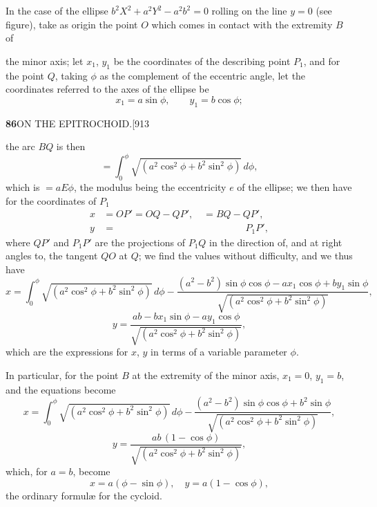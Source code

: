\documentclass[11pt]{article}
\begin{document}
\hspace{1em} In the case of the ellipse $b^{2}X^{2}+a^{2}Y^{2}-a^{2}b^{2}=0$
rolling on the line $y=0$ (see figure), take as origin the point $O$ which
comes in contact with the extremity $B$ of

\begin{center}
\end{center}

\noindent the minor axis; let $x_{1}$, $y_{1}$ be the coordinates of the
describing point $P_{1}$, and for the point $Q$, taking $\phi$ as the
complement of the eccentric angle, let the coordinates referred to the axes of
the ellipse be
\[
x_{1}=a\sin\phi,\qquad y_{1}=b\cos\phi;
\]

\newpage
\noindent\textbf{86}\hfill ON THE EPITROCHOID.\hfill[913

\smallskip
the arc $BQ$ is then
\[
=\int_{0}^{\phi}\sqrt{(a^{2}\cos^{2}\phi+b^{2}\sin^{2}\phi)}\,d\phi,
\]
which is $=aE\phi$, the modulus being the eccentricity $e$ of the ellipse; we
then have for the coordinates of $P_{1}$
\[
\begin{aligned}
x &= OP'=OQ-QP',\quad =BQ-QP',\\
y &= \phantom{OP'=OQ-QP',\quad =BQ-}\;P_{1}P',
\end{aligned}
\]
where $QP'$ and $P_{1}P'$ are the projections of $P_{1}Q$ in the direction of,
and at right angles to, the tangent $QO$ at $Q$; we find the values without
difficulty, and we thus have
\[
x=\int_{0}^{\phi}\sqrt{(a^{2}\cos^{2}\phi+b^{2}\sin^{2}\phi)}\,d\phi
-\frac{(a^{2}-b^{2})\sin\phi\cos\phi-ax_{1}\cos\phi+by_{1}\sin\phi}{\sqrt{(a^{2}\cos^{2}\phi+b^{2}\sin^{2}\phi)}},
\]
\[
y=\frac{ab-bx_{1}\sin\phi-ay_{1}\cos\phi}{\sqrt{(a^{2}\cos^{2}\phi+b^{2}\sin^{2}\phi)}},
\]
which are the expressions for $x$, $y$ in terms of a variable parameter
$\phi$.

\hspace{1em} In particular, for the point $B$ at the extremity of the minor
axis, $x_{1}=0$, $y_{1}=b$, and the equations become
\[
x=\int_{0}^{\phi}\sqrt{(a^{2}\cos^{2}\phi+b^{2}\sin^{2}\phi)}\,d\phi
-\frac{(a^{2}-b^{2})\sin\phi\cos\phi+b^{2}\sin\phi}{\sqrt{(a^{2}\cos^{2}\phi+b^{2}\sin^{2}\phi)}},
\]
\[
y=\frac{ab\,(1-\cos\phi)}{\sqrt{(a^{2}\cos^{2}\phi+b^{2}\sin^{2}\phi)}},
\]
which, for $a=b$, become
\[
x=a(\phi-\sin\phi),\quad y=a(1-\cos\phi),
\]
the ordinary formul\ae{} for the cycloid.
\end{document}
